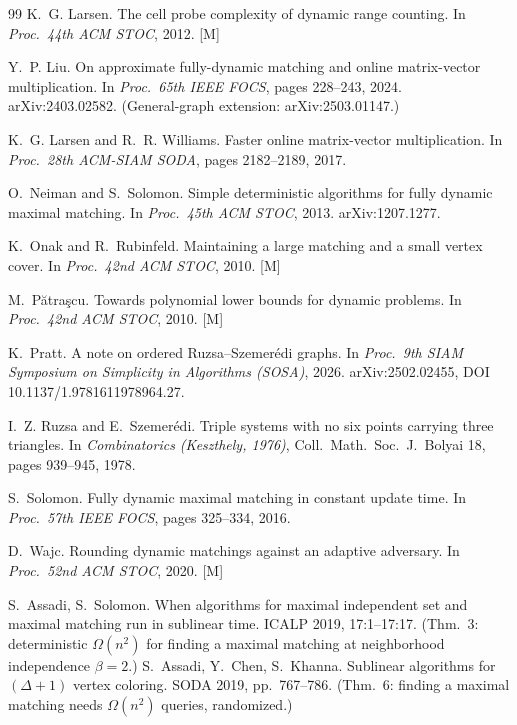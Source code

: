 \documentclass[11pt]{article}
\theoremstyle{definition}
\theoremstyle{remark}
\newcommand{\statusM}{\textcolor{orange!80!black}{\textsf{[M]}}}
\begin{document}
\begin{thebibliography}{99}
K.~G. Larsen.
The cell probe complexity of dynamic range counting.
In \emph{Proc.\ 44th ACM STOC}, 2012. \statusM

Y.~P. Liu.
On approximate fully-dynamic matching and online matrix-vector
multiplication.
In \emph{Proc.\ 65th IEEE FOCS}, pages 228--243, 2024. arXiv:2403.02582.
(General-graph extension: arXiv:2503.01147.)

K.~G. Larsen and R.~R. Williams.
Faster online matrix-vector multiplication.
In \emph{Proc.\ 28th ACM-SIAM SODA}, pages 2182--2189, 2017.

O.~Neiman and S.~Solomon.
Simple deterministic algorithms for fully dynamic maximal matching.
In \emph{Proc.\ 45th ACM STOC}, 2013. arXiv:1207.1277.

K.~Onak and R.~Rubinfeld.
Maintaining a large matching and a small vertex cover.
In \emph{Proc.\ 42nd ACM STOC}, 2010. \statusM

M.~P\u{a}tra\c{s}cu.
Towards polynomial lower bounds for dynamic problems.
In \emph{Proc.\ 42nd ACM STOC}, 2010. \statusM

K.~Pratt.
A note on ordered Ruzsa--Szemer\'edi graphs.
In \emph{Proc.\ 9th SIAM Symposium on Simplicity in Algorithms (SOSA)},
2026. arXiv:2502.02455, DOI 10.1137/1.9781611978964.27.

I.~Z. Ruzsa and E.~Szemer\'edi.
Triple systems with no six points carrying three triangles.
In \emph{Combinatorics (Keszthely, 1976)}, Coll.\ Math.\ Soc.\ J.\
Bolyai 18, pages 939--945, 1978.

S.~Solomon.
Fully dynamic maximal matching in constant update time.
In \emph{Proc.\ 57th IEEE FOCS}, pages 325--334, 2016.

D.~Wajc.
Rounding dynamic matchings against an adaptive adversary.
In \emph{Proc.\ 52nd ACM STOC}, 2020. \statusM

 S.~Assadi, S.~Solomon. When algorithms for maximal
independent set and maximal matching run in sublinear time. ICALP
2019, 17:1--17:17. (Thm.~3: deterministic $\Omega(n^2)$ for finding a
maximal matching at neighborhood independence $\beta=2$.)
 S.~Assadi, Y.~Chen, S.~Khanna. Sublinear algorithms
for $(\Delta+1)$ vertex coloring. SODA 2019, pp.~767--786.
(Thm.~6: finding a maximal matching needs $\Omega(n^2)$ queries,
randomized.)
\end{thebibliography}
\end{document}
